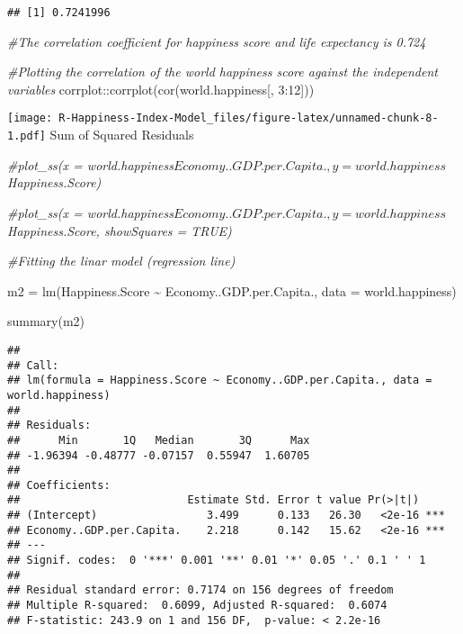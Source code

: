 \documentclass[
]{article}
\newenvironment{Shaded}{\begin{snugshade}}{\end{snugshade}}
\newcommand{\AttributeTok}[1]{\textcolor[rgb]{0.77,0.63,0.00}{#1}}
\newcommand{\CommentTok}[1]{\textcolor[rgb]{0.56,0.35,0.01}{\textit{#1}}}
\newcommand{\DecValTok}[1]{\textcolor[rgb]{0.00,0.00,0.81}{#1}}
\newcommand{\FunctionTok}[1]{\textcolor[rgb]{0.00,0.00,0.00}{#1}}
\newcommand{\NormalTok}[1]{#1}
\newcommand{\OtherTok}[1]{\textcolor[rgb]{0.56,0.35,0.01}{#1}}
\newcommand{\SpecialCharTok}[1]{\textcolor[rgb]{0.00,0.00,0.00}{#1}}
\begin{document}
\begin{Shaded}
\end{Shaded}

\begin{verbatim}
## [1] 0.7241996
\end{verbatim}

\begin{Shaded}
\begin{Highlighting}[]
\CommentTok{\#The correlation coefficient for happiness score and life expectancy is 0.724}

\CommentTok{\#Plotting the correlation of the world happiness score against the independent variables}
\NormalTok{corrplot}\SpecialCharTok{::}\FunctionTok{corrplot}\NormalTok{(}\FunctionTok{cor}\NormalTok{(world.happiness[, }\DecValTok{3}\SpecialCharTok{:}\DecValTok{12}\NormalTok{]))}
\end{Highlighting}
\end{Shaded}

\texttt{[image: R-Happiness-Index-Model\_files/figure-latex/unnamed-chunk-8-1.pdf]}
Sum of Squared Residuals

\begin{Shaded}
\begin{Highlighting}[]
\CommentTok{\#plot\_ss(x = world.happiness$Economy..GDP.per.Capita., y = world.happiness$Happiness.Score)}

\CommentTok{\#plot\_ss(x = world.happiness$Economy..GDP.per.Capita., y = world.happiness$Happiness.Score, showSquares = TRUE)}

\CommentTok{\#Fitting the linar model (regression line)}

\NormalTok{m2 }\OtherTok{=} \FunctionTok{lm}\NormalTok{(Happiness.Score }\SpecialCharTok{\textasciitilde{}}\NormalTok{ Economy..GDP.per.Capita., }\AttributeTok{data =}\NormalTok{ world.happiness)}

\FunctionTok{summary}\NormalTok{(m2)}
\end{Highlighting}
\end{Shaded}

\begin{verbatim}
## 
## Call:
## lm(formula = Happiness.Score ~ Economy..GDP.per.Capita., data = world.happiness)
## 
## Residuals:
##      Min       1Q   Median       3Q      Max 
## -1.96394 -0.48777 -0.07157  0.55947  1.60705 
## 
## Coefficients:
##                          Estimate Std. Error t value Pr(>|t|)    
## (Intercept)                 3.499      0.133   26.30   <2e-16 ***
## Economy..GDP.per.Capita.    2.218      0.142   15.62   <2e-16 ***
## ---
## Signif. codes:  0 '***' 0.001 '**' 0.01 '*' 0.05 '.' 0.1 ' ' 1
## 
## Residual standard error: 0.7174 on 156 degrees of freedom
## Multiple R-squared:  0.6099, Adjusted R-squared:  0.6074 
## F-statistic: 243.9 on 1 and 156 DF,  p-value: < 2.2e-16
\end{verbatim}
\end{document}
